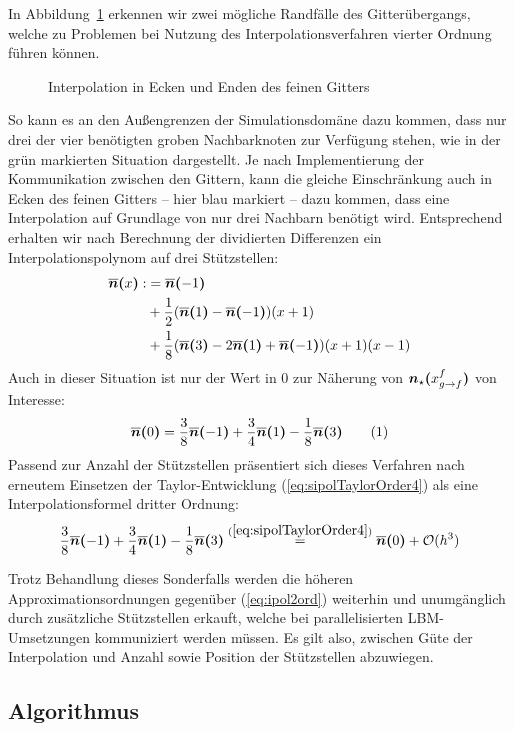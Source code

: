 In Abbildung~\ref{fig:InterpolationEdgeCase} erkennen wir zwei mögliche Randfälle des Gitterübergangs, welche zu Problemen bei Nutzung des Interpolationsverfahren vierter Ordnung führen können.
\begin{figure}[h]
\centering

\caption{Interpolation in Ecken und Enden des feinen Gitters}
\label{fig:InterpolationEdgeCase}
\end{figure}

\noindent
So kann es an den Außengrenzen der Simulationsdomäne dazu kommen, dass nur drei der vier benötigten groben Nachbarknoten zur Verfügung stehen, wie in der grün markierten Situation dargestellt.
Je nach Implementierung der Kommunikation zwischen den Gittern, kann die gleiche Einschränkung auch in Ecken des feinen Gitters -- hier blau markiert -- dazu kommen, dass eine Interpolation auf Grundlage von nur drei Nachbarn benötigt wird. Entsprechend erhalten wir nach Berechnung der dividierten Differenzen ein Interpolationspolynom auf drei Stützstellen:
\begin{align*}
\overline{\boldsymbol{n}}\boldsymbol{(}{x}\boldsymbol{)} :&= \overline{\boldsymbol{n}}\boldsymbol{(}{-1}\boldsymbol{)} \\
&+ \frac{1}{2}(\overline{\boldsymbol{n}}\boldsymbol{(}{1}\boldsymbol{)}-\overline{\boldsymbol{n}}\boldsymbol{(}{-1}\boldsymbol{)})(x+1)\\
&+ \frac{1}{8}(\overline{\boldsymbol{n}}\boldsymbol{(}{3}\boldsymbol{)}-2\overline{\boldsymbol{n}}\boldsymbol{(}{1}\boldsymbol{)}+\overline{\boldsymbol{n}}\boldsymbol{(}{-1}\boldsymbol{)})(x+1)(x-1)
\end{align*}
Auch in dieser Situation ist nur der Wert in \(0\) zur Näherung von \(\boldsymbol{n}_{\star}\boldsymbol{(}{x_{g \to f}^f}\boldsymbol{)}\) von Interesse:
\[\sipolarg{0} = \frac{3}{8}\sipolarg{-1} + \frac{3}{4}\sipolarg{1} - \frac{1}{8}\sipolarg{3} \numberthis\label{eq:ipol3ord}\]
Passend zur Anzahl der Stützstellen präsentiert sich dieses Verfahren nach erneutem Einsetzen der Taylor-Entwicklung (\ref{eq:sipolTaylorOrder4}) als eine Interpolationsformel dritter Ordnung:
\[\frac{3}{8}\overline{\boldsymbol{n}}\boldsymbol{(}{-1}\boldsymbol{)} + \frac{3}{4}\overline{\boldsymbol{n}}\boldsymbol{(}{1}\boldsymbol{)} - \frac{1}{8}\overline{\boldsymbol{n}}\boldsymbol{(}{3}\boldsymbol{)} \stackrel{(\ref{eq:sipolTaylorOrder4})}{=} \overline{\boldsymbol{n}}\boldsymbol{(}{0}\boldsymbol{)} + \mathcal{O}(h^3)\]

Trotz Behandlung dieses Sonderfalls werden die höheren Approximationsordnungen gegenüber (\ref{eq:ipol2ord}) weiterhin und unumgänglich durch zusätzliche Stützstellen erkauft, welche bei parallelisierten LBM-Umsetzungen kommuniziert werden müssen. Es gilt also, zwischen Güte der Interpolation und Anzahl sowie Position der Stützstellen abzuwiegen.

\newpage
\subsection{Algorithmus}\label{kap:Algorithmus}

